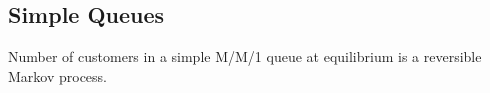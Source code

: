 \documentclass[a4paper,10pt,english]{article}
\begin{document}


\subsection{Simple Queues}
\begin{cor} Number of customers in a simple M/M/1 queue at equilibrium is a reversible Markov process.
\end{cor}
\end{document}
